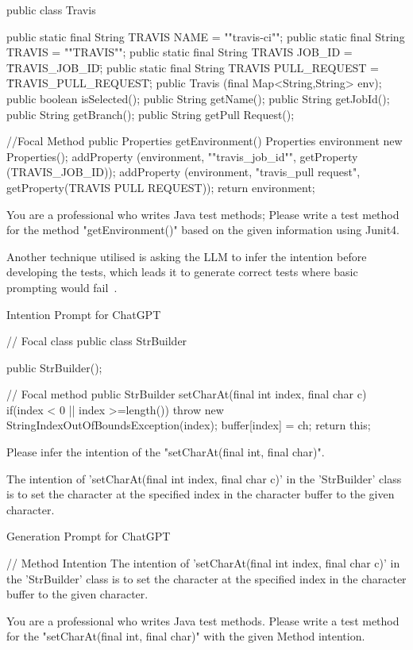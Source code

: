 \begin{prompt}
public class Travis {
public static final String TRAVIS NAME = ""travis-ci"";
public static final String TRAVIS = ""TRAVIS"";
public static final String TRAVIS JOB_ID = \"TRAVIS_JOB_ID\";
public static final String TRAVIS PULL_REQUEST = \"TRAVIS_PULL_REQUEST\";
public Travis (final Map<String,String> env);
public boolean isSelected();
public String getName();
public String getJobId();
public String getBranch();
public String getPull Request();

//Focal Method
public Properties getEnvironment() {
  Properties environment new Properties();
  addProperty (environment, ""travis_job_id"", getProperty (TRAVIS_JOB_ID));
  addProperty (environment, "travis_pull request", getProperty(TRAVIS PULL REQUEST));
  return environment;
  }
}

You are a professional who writes Java test methods;
Please write a test method for the method "getEnvironment()" based on the given information using Junit4.
\end{prompt}

Another technique utilised is asking the LLM to infer the intention before developing the tests, which leads it to generate correct tests where basic prompting would fail~\cite{kn:chattester}.

\begin{prompt}
Intention Prompt for ChatGPT

// Focal class
public class StrBuilder {
  public StrBuilder();

  // Focal method
  public StrBuilder setCharAt(final int index, final char c){
    if(index < 0 || index >=length()) {
      throw new StringIndexOutOfBoundsException(index);
    }
    buffer[index] = ch; return this;
  }
}

Please infer the intention of the "setCharAt(final int, final char)".
\end{prompt}

\begin{response}
The intention of 'setCharAt(final int index, final char c)' in the 'StrBuilder' class is to set the character at the specified index in the character buffer to the given character.
\end{response}

\begin{prompt}
Generation Prompt for ChatGPT

// Method Intention
The intention of 'setCharAt(final int index, final char c)' in the 'StrBuilder' class is to set the character at the specified index in the character buffer to the given character.

You are a professional who writes Java test methods.
Please write a test method for the "setCharAt(final int, final char)" with the given Method intention.
\end{prompt}

